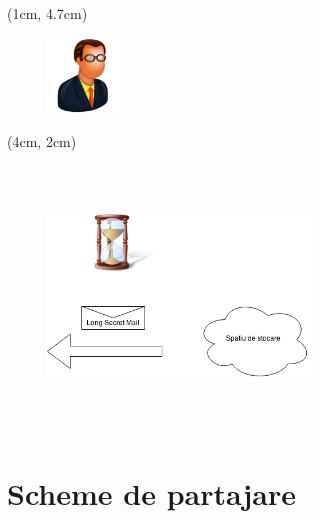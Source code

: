 \documentclass{beamer}
\begin{document}
\begin{frame}
{        \begin{textblock*}{2cm}(1cm, 4.7cm)
        \begin{figure}
            \includegraphics[width=2cm,height=2cm,keepaspectratio]{img/motivation/old-128.png}
        \end{figure}
        \end{textblock*}
    }
     {

        \begin{textblock*}{4cm}(4cm, 2cm)
        \begin{figure}
            \includegraphics[width=7cm,height=7cm,keepaspectratio]{img/motivation/after_system.png}
        \end{figure}
        \end{textblock*}
    }
\end{frame}

\section{Scheme de partajare}
\end{document}
